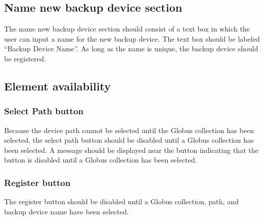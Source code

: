 \subsection{Name new backup device section}

The name new backup device section should consist of a text box in which the user can
input a name for the new backup device. The text box should be labeled ``Backup Device
Name''. As long as the name is unique, the backup device should be registered.

\subsection{Element availability}

\subsubsection{Select Path button}

Because the device path cannot be selected until the Globus collection has been selected,
the select path button should be disabled until a Globus collection has been selected. A 
message should be displayed near the button indicating that the button is disabled until 
a Globus collection has been selected.

\subsubsection{Register button}

The register button should be disabled until a Globus collection, path, and backup device
name have been selected.